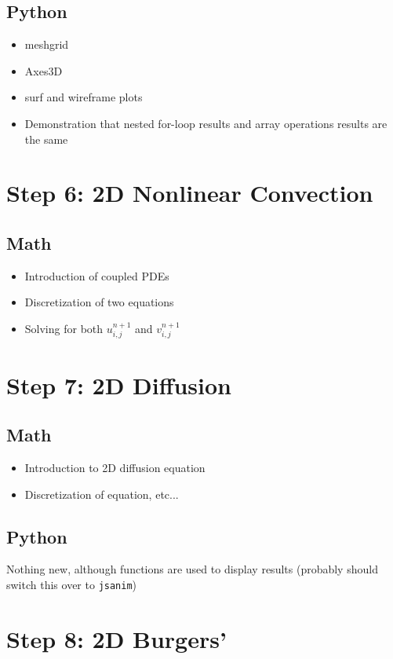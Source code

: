 \documentclass[10pt,a4paper]{report}
\begin{document}
\subsection*{Python}

\begin{itemize}
\item[] meshgrid
\item[] Axes3D
\item[] surf and wireframe plots
\item[] Demonstration that nested for-loop results and array operations results are the same
\end{itemize}

\section*{Step 6: 2D Nonlinear Convection}

\subsection*{Math}
\begin{itemize}
\item[] Introduction of coupled PDEs
\item[] Discretization of two equations
\item[] Solving for both $u^{n+1}_{i,j}$ and $v^{n+1}_{i,j}$
\end{itemize}

\section*{Step 7: 2D Diffusion}

\subsection*{Math}
\begin{itemize}
\item[] Introduction to 2D diffusion equation 
\item[] Discretization of equation, etc...
\end{itemize}

\subsection*{Python}
Nothing new, although functions are used to display results (probably should switch this over to \texttt{jsanim})

\section*{Step 8: 2D Burgers'}
\end{document}
